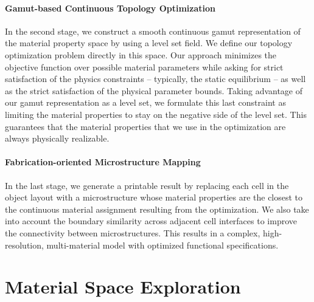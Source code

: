\paragraph{Gamut-based Continuous Topology Optimization}
In the second stage, we construct a smooth continuous gamut representation of the material property space by using a level set field. We define our topology optimization problem directly in this space. Our approach minimizes the objective function over possible material parameters while asking for strict satisfaction of the physics constraints -- typically, the static equilibrium -- as well as the strict satisfaction of the physical parameter bounds. Taking advantage of our gamut representation as a level set, we formulate this last constraint as limiting the material properties to stay on the negative side of the level set. This guarantees that the material properties that we use in the optimization are always physically realizable.

\paragraph{Fabrication-oriented Microstructure Mapping}
In the last stage, we generate a printable result by replacing each cell in the object layout with a microstructure whose material properties are the closest to the continuous material assignment resulting from the optimization. We also take into account the boundary similarity across adjacent cell interfaces to improve the connectivity between microstructures. This results in a complex, high-resolution, multi-material model with optimized functional specifications.

\section{Material Space Exploration}
\label{sec:sampling}

